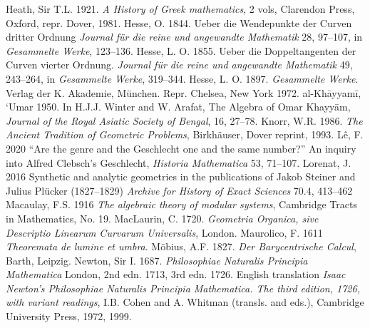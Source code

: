  \newline\indent Heath, Sir T.L. 1921. \emph{A History of Greek mathematics}, 2 vols, Clarendon Press, Oxford, repr. Dover, 1981.
 \newline\indent Hesse, O. 1844. Ueber die Wendepunkte der  Curven dritter Ordnung \emph{Journal f{\"u}r die reine und angewandte Mathematik} 28, 97--107, in \emph{Gesammelte Werke}, 123--136.
\newline\indent  Hesse, L. O. 1855. Ueber die Doppeltangenten der Curven vierter Ordnung. \emph{Journal f{\"u}r die reine und angewandte Mathematik} 49, 243--264, in \emph{Gesammelte Werke}, 319--344.
\newline\indent Hesse, L. O. 1897. \emph{Gesammelte Werke}. Verlag der K.  Akademie, M\"{u}nchen. Repr. Chelsea, New York 1972.
\newline\indent al-Kh\={a}yyam\={i}, `Umar 1950. In H.J.J. Winter and W. Arafat, The Algebra of Omar Khayy\={a}m, \emph{Journal of the Royal Asiatic Society of Bengal}, 16, 27--78.
 \newline\indent Knorr, W.R.  1986. \emph{The Ancient Tradition of Geometric Problems}, Birkh\"auser, Dover reprint, 1993.
 \newline\indent L\^e, F. 2020 ``Are the genre and the Geschlecht one and the same number?'' An inquiry into Alfred Clebsch's Geschlecht, \emph{Historia Mathematica} 53, 71--107.
 \newline\indent Lorenat, J. 2016 Synthetic and analytic geometries in the publications of Jakob Steiner and Julius Pl\"ucker (1827--1829) \emph{Archive for History of Exact Sciences}  70.4, 413--462
 \newline\indent Macaulay, F.S.  1916  \emph{The algebraic theory of modular systems},  Cambridge Tracts in Mathematics, No. 19.
\newline\indent  MacLaurin, C. 1720.  \emph{Geometria Organica, sive Descriptio Linearum Curvarum Universalis}, London.
 \newline\indent Maurolico, F. 1611 \emph{Theoremata de lumine et umbra}. 
 \newline\indent M\"obius, A.F. 1827. \emph{Der Barycentrische Calcul}, Barth, Leipzig.
\newline\indent Newton, Sir I. 1687. \emph{Philosophiae  Naturalis Principia Mathematica} London, 2nd edn. 1713, 3rd edn. 1726. English translation \emph{Isaac Newton's Philosophiae Naturalis Principia Mathematica. The third edition, 1726, with variant readings}, I.B. Cohen and A. Whitman (transls. and eds.), Cambridge University Press, 1972, 1999.
